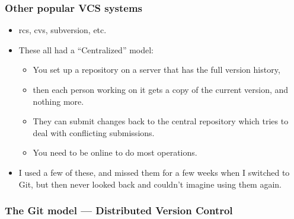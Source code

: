 \documentclass[]{book}
\providecommand{\tightlist}{%
  \setlength{\itemsep}{0pt}\setlength{\parskip}{0pt}}
\theoremstyle{definition}
\theoremstyle{definition}
\theoremstyle{remark}
\begin{document}
\subsubsection{Other popular VCS
systems}\label{other-popular-vcs-systems}

\begin{itemize}
\tightlist
\item
  rcs, cvs, subversion, etc.
\item
  These all had a ``Centralized'' model:

  \begin{itemize}
  \tightlist
  \item
    You set up a repository on a server that has the full version
    history,
  \item
    then each person working on it gets a copy of the current version,
    and nothing more.
  \item
    They can submit changes back to the central repository which tries
    to deal with conflicting submissions.
  \item
    You need to be online to do most operations.
  \end{itemize}
\item
  I used a few of these, and missed them for a few weeks when I switched
  to Git, but then never looked back and couldn't imagine using them
  again.
\end{itemize}

\subsubsection{The Git model --- Distributed Version
Control}\label{the-git-model-distributed-version-control}
\end{document}

